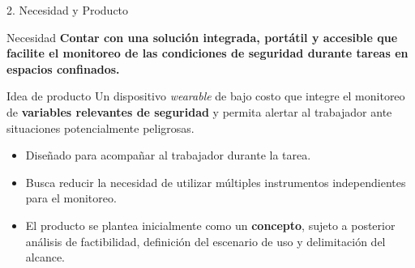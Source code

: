 \documentclass[10pt, aspectratio=169]{beamer}
\begin{document}

\begin{frame}{2. Necesidad y Producto}

    \begin{block}{Necesidad}
        \large
        \textbf{
            Contar con una solución integrada, portátil y accesible
            que facilite el monitoreo de las condiciones de seguridad
            durante tareas en espacios confinados.
        }
    \end{block}

    \vspace{0.3cm}

    \begin{block}{Idea de producto}
        \large
        Un dispositivo \textit{wearable} de bajo costo que integre
        el monitoreo de \textbf{variables relevantes de seguridad}
        y permita alertar al trabajador ante situaciones
        potencialmente peligrosas.
    \end{block}

    \vspace{0.25cm}

    \begin{itemize}

        \item Diseñado para acompañar al trabajador durante la tarea.

        \item Busca reducir la necesidad de utilizar múltiples
        instrumentos independientes para el monitoreo.

        \item El producto se plantea inicialmente como un
        \textbf{concepto}, sujeto a posterior análisis de factibilidad,
        definición del escenario de uso y delimitación del alcance.

    \end{itemize}

\end{frame}


\end{document}
